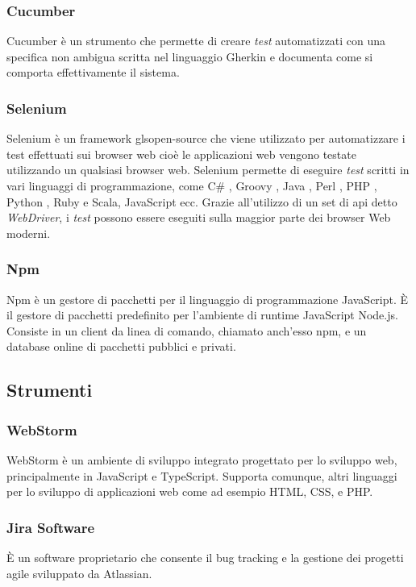\subsubsection*{Cucumber}
Cucumber è un strumento che permette di creare \emph{test} automatizzati con una specifica non ambigua scritta nel linguaggio Gherkin e documenta come si comporta effettivamente il sistema.

\subsubsection*{Selenium}
Selenium è un framework gls{open-source}\ap{[g]} che viene utilizzato per automatizzare i test effettuati sui browser web cioè le applicazioni web vengono testate utilizzando un qualsiasi browser web. Selenium permette di eseguire \emph{test} scritti in vari linguaggi di programmazione, come C\# , Groovy , Java , Perl , PHP , Python , Ruby e Scala, JavaScript ecc. Grazie all'utilizzo di un set di \gls{api}\ap{[g]} detto \emph{WebDriver}, i \emph{test} possono essere eseguiti sulla maggior parte dei browser Web moderni.

\subsubsection*{Npm}
 Npm è un gestore di pacchetti per il linguaggio di programmazione JavaScript. È il gestore di pacchetti predefinito per l'ambiente di runtime JavaScript Node.js. Consiste in un client da linea di comando, chiamato anch'esso npm, e un database online di pacchetti pubblici e privati.

\subsection{Strumenti}

\subsubsection*{WebStorm}
WebStorm è un ambiente di sviluppo integrato progettato per lo sviluppo web, principalmente in JavaScript e TypeScript. Supporta comunque, altri linguaggi per lo sviluppo di applicazioni web come ad esempio HTML, CSS, e PHP.

\subsubsection{Jira Software}
È un software proprietario che consente il bug tracking e la gestione dei progetti agile sviluppato da Atlassian.

